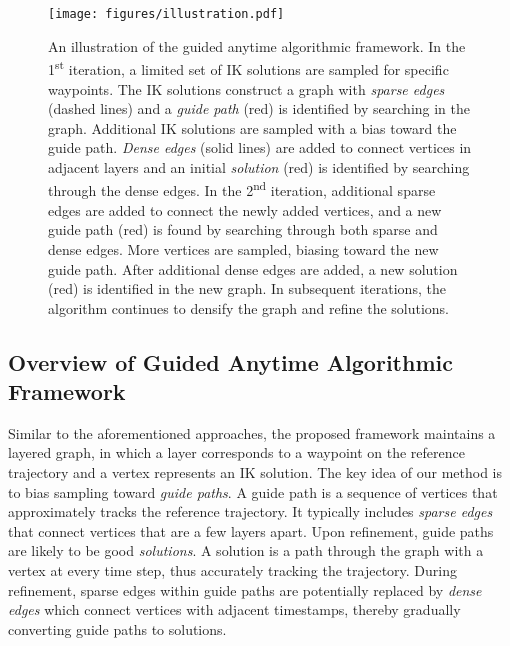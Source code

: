 \begin{figure*}[tb]
\texttt{[image: figures/illustration.pdf]}
\vspace{-3mm}
\caption{An illustration of the guided anytime algorithmic framework. In the 1\textsuperscript{st} iteration, \protect{} a limited set of IK solutions are sampled for specific waypoints. \protect{} The IK solutions construct a graph with \textit{sparse edges} (dashed lines) and a \textit{guide path} (red) is identified by searching in the graph. \protect{} Additional IK solutions are sampled with a bias toward the guide path. \protect{} \textit{Dense edges} (solid lines) are added to connect vertices in adjacent layers and an initial \textit{solution} (red) is identified by searching through the dense edges. In the 2\textsuperscript{nd} iteration, \protect{} additional sparse edges are added to connect the newly added vertices, and a new guide path (red) is found by searching through both sparse and dense edges. \protect{} More vertices are sampled, biasing toward the new guide path. \protect{} After additional dense edges are added, a new solution (red) is identified in the new graph.  In subsequent iterations, the algorithm continues to densify the graph and refine the solutions. } 
\vspace{-5mm}
\label{fig:illustration}
\end{figure*}


\vspace{-3mm}
\subsection{Overview of Guided Anytime Algorithmic Framework} \label{sec: alg_overview}

Similar to the aforementioned approaches, the proposed framework maintains a layered graph, in which a layer corresponds to a waypoint on the reference trajectory and a vertex represents an IK solution. 
The key idea of our method is to bias sampling toward \emph{guide paths}. A guide path is a sequence of vertices that approximately tracks the reference trajectory. It typically includes \emph{sparse edges} that connect vertices that are a few layers apart. Upon refinement, guide paths are likely to be good \textit{solutions}. A solution is a path through the graph with a vertex at every time step, thus accurately tracking the trajectory. During refinement, sparse edges within guide paths are potentially replaced by \textit{dense edges} which connect vertices with adjacent timestamps, thereby gradually converting guide paths to solutions. 



